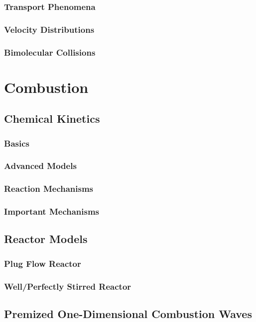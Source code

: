 \documentclass[12pt]{article}
\begin{document}
\subsubsection{Transport Phenomena}
\subsubsection{Velocity Distributions}
\subsubsection{Bimolecular Collisions}


\section{Combustion}
\subsection{Chemical Kinetics}
\subsubsection{Basics}
\subsubsection{Advanced Models}
\subsubsection{Reaction Mechanisms}
\subsubsection{Important Mechanisms}

\subsection{Reactor Models}
\subsubsection{Plug Flow Reactor}
\subsubsection{Well/Perfectly Stirred Reactor}

\subsection{Premized One-Dimensional Combustion Waves}
\end{document}
